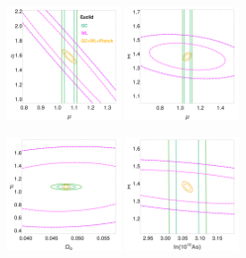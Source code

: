 \begin{figure}[htbp]
\begin{centering}
\includegraphics[width=0.3\textwidth]{Chapters/linear-nonlinear-MG-forecasts/figures/ellipses/DE-related/ellipsesPlot-withLegendManual-MuEtaFisher-Marged-fiducialMGDE2nonuhs-GC_WL_GC+WL+Planck--nlHS-pars-6-7_-.pdf}
\includegraphics[width=0.3\textwidth]{Chapters/linear-nonlinear-MG-forecasts/figures/ellipses/DE-related/ellipsesPlot-noLegendManual-MuSigmaFisher-Marged-fiducialMGDE2nonuhs-GC_WL_GC+WL+Planck--nlHS-pars-6-7_-.pdf} 
\end{centering}

\begin{centering}
\includegraphics[width=0.3\textwidth]{Chapters/linear-nonlinear-MG-forecasts/figures/ellipses/DE-related/ellipsesPlot-noLegendManual-MuSigmaFisher-Marged-fiducialMGDE2nonuhs-GC_WL_GC+WL+Planck--nlHS-pars-2-6_-.pdf}
\includegraphics[width=0.3\textwidth]{Chapters/linear-nonlinear-MG-forecasts/figures/ellipses/DE-related/ellipsesPlot-noLegendManual-MuSigmaFisher-Marged-fiducialMGDE2nonuhs-GC_WL_GC+WL+Planck--nlHS-pars-4-7_-.pdf} 
\end{centering}


\end{figure}
